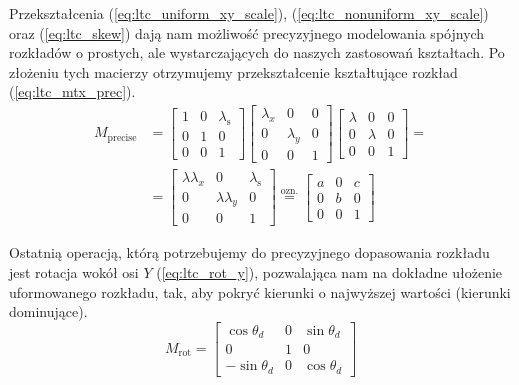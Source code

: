 \documentclass[../main.tex]{subfiles}
\begin{document}
Przekształcenia (\ref{eq:ltc_uniform_xy_scale}), (\ref{eq:ltc_nonuniform_xy_scale}) oraz (\ref{eq:ltc_skew}) dają nam możliwość precyzyjnego modelowania spójnych rozkładów o prostych, ale wystarczających do naszych zastosowań kształtach. Po złożeniu tych macierzy otrzymujemy przekształcenie kształtujące rozkład (\ref{eq:ltc_mtx_prec}).
\begin{equation}
\begin{aligned}
M_{\text{precise}} &=
\begin{bmatrix}
1 & 0 & \lambda_{\text{s}} \\
0 & 1 & 0 \\
0 & 0 & 1
\end{bmatrix}
\begin{bmatrix}
\lambda_x & 0 & 0 \\
0 & \lambda_y & 0 \\
0 & 0 & 1
\end{bmatrix}
\begin{bmatrix}
\lambda & 0 & 0 \\
0 & \lambda & 0 \\
0 & 0 & 1
\end{bmatrix} 
=
\\
&=
\begin{bmatrix}
\lambda\lambda_x & 0 & \lambda_{\text{s}} \\
0 & \lambda\lambda_y & 0 \\
0 & 0 & 1
\end{bmatrix}
\stackrel{\text{ozn.}}{=}
\begin{bmatrix}
a & 0 & c \\
0 & b & 0 \\
0 & 0 & 1
\end{bmatrix}
\end{aligned}
\label{eq:ltc_mtx_prec}
\end{equation}

Ostatnią operacją, którą potrzebujemy do precyzyjnego dopasowania rozkładu jest rotacja wokół osi $Y$ (\ref{eq:ltc_rot_y}), pozwalająca nam na dokładne ułożenie uformowanego rozkładu, tak, aby pokryć kierunki o najwyższej wartości (kierunki dominujące).
\begin{equation}
M_{\text{rot}} =
\begin{bmatrix}
\cos\theta_d  & 0     & \sin\theta_d \\
0           & 1     & 0 \\
-\sin\theta_d & 0     & \cos\theta_d
\end{bmatrix}
\label{eq:ltc_rot_y}
\end{equation}
\end{document}
